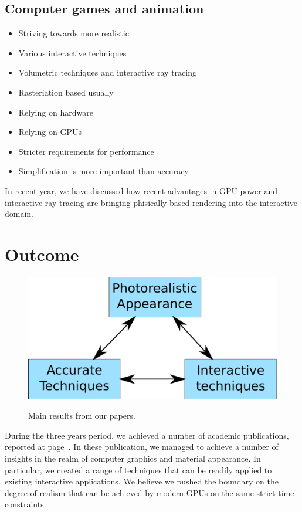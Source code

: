 \subsection{Computer games and animation}
\begin{itemize}
\item Striving towards more realistic
\item Various interactive techniques
\item Volumetric techniques and interactive ray tracing
\item Rasteriation based usually
\item Relying on hardware
\item Relying on GPUs
\item Stricter requirements for performance
\item Simplification is more important than accuracy
\end{itemize}

In recent year, we have discussed how recent advantages in GPU power and interactive ray tracing are bringing phisically based rendering into the interactive domain. 

\section{Outcome}

\begin{figure}
\centering
	 \includegraphics[draft,width=\textwidth]{figures/main_diagram}  \\
\caption{Main results from our papers.} 
\label{fig:main_results}
\end{figure}


During the three years period, we achieved a number of academic publications, reported at page~\pageref{sec:contributionlist}. In these publication, we managed to achieve a number of insights in the realm of computer graphics and material appearance. In particular, we created a range of techniques that can be readily applied to existing interactive applications. We believe we pushed the boundary on the degree of realism that can be achieved by modern GPUs on the same strict time constraints. 

